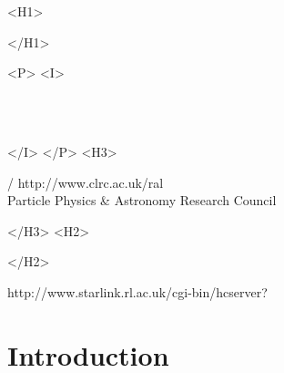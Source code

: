 \begin{htmlonly}
\xlabel{}
\begin{rawhtml} <H1> \end{rawhtml}
\stardoctitle
\begin{rawhtml} </H1> \end{rawhtml}


\begin{rawhtml} <P> <I> \end{rawhtml}
\stardoccategory \stardocnumber \\
\stardocauthors \\
\stardocdate
\begin{rawhtml} </I> </P> <H3> \end{rawhtml}
 /
{http://www.clrc.ac.uk/ral} \\
Particle Physics \& Astronomy Research Council \\
\begin{rawhtml} </H3> <H2> \end{rawhtml}
\begin{rawhtml} </H2> \end{rawhtml}
{http://www.starlink.rl.ac.uk/cgi-bin/hcserver?\stardocsource}\\


\end{htmlonly}

\setlength{\parskip}{0mm}
\tableofcontents
\setlength{\parskip}{\medskipamount}
\markright{\stardocname}

\newpage
\section {Introduction}

